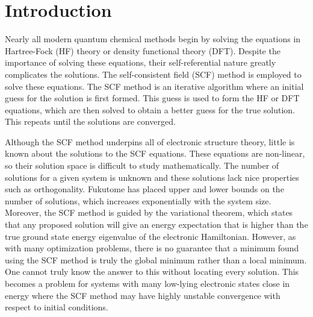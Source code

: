 \documentclass[final,3p,times,twocolumn]{elsarticle}
\begin{document}
\section{Introduction} \label{sec:intro}
Nearly all modern quantum chemical methods begin by solving the equations in Hartree-Fock (HF) theory\cite{hartree,fock,slater} or density functional theory (DFT).\cite{dft1,dft2} Despite the importance of solving these equations, their self-referential nature greatly complicates the solutions. The self-consistent field (SCF) method is employed to solve these equations.\cite{hartree,szabo,scf} The SCF method is an iterative algorithm where an initial guess for the solution is first formed. This guess is used to form the HF or DFT equations, which are then solved to obtain a better guess for the true solution. This repeats until the solutions are converged.


Although the SCF method underpins all of electronic structure theory, little is known about the solutions to the SCF equations. These equations are non-linear, so their solution space is difficult to study mathematically. The number of solutions for a given system is unknown and these solutions lack nice properties such as orthogonality.\cite{scfmd} Fukutome has placed upper and lower bounds on the number of solutions, which increases exponentially with the system size.\cite{fukutome-1971} Moreover, the SCF method is guided by the variational theorem, which states that any proposed solution will give an energy expectation that is higher than the true ground state energy eigenvalue of the electronic Hamiltonian. However, as with many optimization problems, there is no guarantee that a minimum found using the SCF method is truly the global minimum rather than a local minimum. One cannot truly know the answer to this without locating every solution. This becomes a problem for systems with many low-lying electronic states close in energy where the SCF method may have highly unstable convergence with respect to initial conditions.
\end{document}
